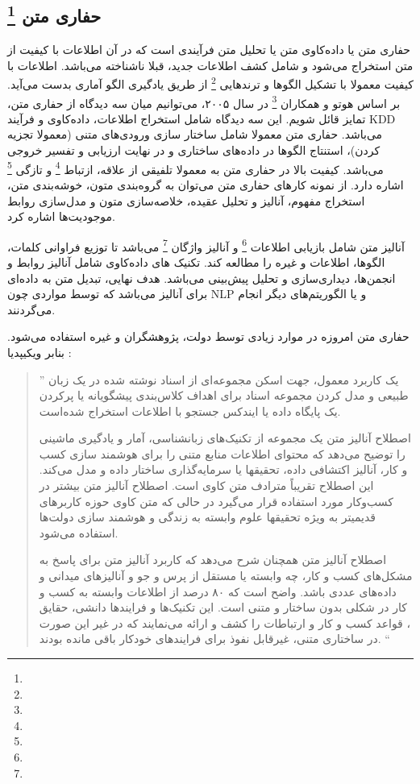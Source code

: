 \documentclass[a4paper, 12pt]{article}
\begin{document}
 
 \subsection*{حفاری متن
\footnote{} 
}
حفاری متن یا داده‌کاوی متن یا تحلیل متن فرآیندی است که در آن اطلاعات با کیفیت از متن استخراج می‌شود و شامل کشف اطلاعات جدید، قبلا ناشناخته می‌باشد. اطلاعات با کیفیت معمولا با تشکیل الگو‌ها و ترندهایی
\footnote{}
  از طریق یادگیری الگو‌‌ آماری بدست می‌آید. بر اساس هوتو و همکاران
  \footnote{}
   در سال ۲۰۰۵، می‌توانیم میان سه دیدگاه از حفاری متن، تمایز قائل شویم. این سه دیدگاه شامل استخراج اطلاعات، داده‌کاوی و فرآیند KDD می‌باشد. حفاری متن معمولا شامل ساختار سازی ورودی‌های متنی (معمولا تجزیه کردن)، استنتاج الگو‌ها در داده‌های ساختاری و در نهایت ارزیابی و تفسیر خروجی می‌باشد. کیفیت بالا در حفاری متن به معمولا تلفیقی از علاقه، ازتباط
   \footnote{}
   و تازگی 
   \footnote{}
   اشاره دارد. از نمونه کار‌های حفاری متن می‌توان به گروه‌بندی متون، خوشه‌بندی متن، استخراج مفهوم، آنالیز و تحلیل عقیده، خلاصه‌سازی متون و مدل‌سازی روابط موجودیت‌ها اشاره کرد.
   
   آنالیز متن شامل بازیابی اطلاعات
   \footnote{}
   و آنالیز واژگان
   \footnote{}
   می‌باشد تا توزیع فراوانی کلمات، الگو‌ها، اطلاعات و غیره را مطالعه کند. تکنیک های داده‌کاوی شامل آنالیز روابط و انجمن‌ها، دیداری‌سازی و تحلیل پیش‌بینی می‌باشد. هدف نهایی، تبدیل متن به داده‌ای برای آنالیز می‌باشد که توسط مواردی چون NLP و یا الگوریتم‌های دیگر انجام می‌گردنند.
   
   حفاری متن امروزه در موارد زیادی توسط دولت، پژوهشگران و غیره استفاده می‌شود. بنابر ویکیپدیا :
   \begin{quote}
   	\textquotedblright
   	یک کاربرد معمول، جهت اسکن مجموعه‌ای از اسناد نوشته شده در یک زبان طبیعی و مدل کردن مجموعه اسناد برای اهداف کلاس‌بندی پیشگویانه یا پرکردن یک پایگاه داده یا ایندکس جستجو با اطلاعات استخراج شده‌است.
   	
   	اصطلاح آنالیز متن یک مجموعه از تکنیک‌های زبانشناسی، آمار و یادگیری ماشینی را توضیح می‌دهد که محتوای اطلاعات منابع متنی را برای هوشمند سازی کسب و کار، آنالیز اکتشافی داده، تحقیقها یا سرمایه‌گذاری ساختار داده و مدل می‌کند. این اصطلاح تقریباً مترادف متن کاوی است. اصطلاح آنالیز متن بیشتر در کسب‌وکار مورد استفاده قرار می‌گیرد در حالی که متن کاوی حوزه کاربرهای قدیمیتر به ویژه تحقیقها علوم وابسته به زندگی و هوشمند سازی دولت‌ها استفاده می‌شود.
   	
   	اصطلاح آنالیز متن همچنان شرح می‌دهد که کاربرد آنالیز متن برای پاسخ به مشکل‌های کسب و کار، چه وابسته یا مستقل از پرس و جو و آنالیزهای میدانی و داده‌های عددی باشد. واضح است که ۸۰ درصد از اطلاعات وابسته به کسب و کار در شکلی بدون ساختار و متنی است. این تکنیک‌ها و فرایندها دانشی، حقایق ، قواعد کسب و کار و ارتباطات  را کشف و ارائه می‌نمایند که در غیر این صورت در ساختاری متنی، غیرقابل نفوذ برای فرایندهای خودکار باقی مانده بودند.
   	\textquotedblleft
   \end{quote}   
  
\end{document}

